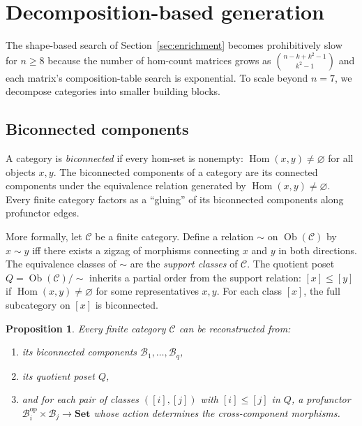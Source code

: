 \documentclass[12pt,a4paper]{amsart}
\newtheorem{proposition}[theorem]{Proposition}
\theoremstyle{definition}
\theoremstyle{remark}
\newcommand{\cat}{\mathcal}
\newcommand{\Set}{\mathbf{Set}}
\newcommand{\op}{\mathrm{op}}
\newcommand{\Ob}{\operatorname{Ob}}
\newcommand{\Hom}{\operatorname{Hom}}
\begin{document}
\section{Decomposition-based generation}
\label{sec:decomposition}

The shape-based search of Section~\ref{sec:enrichment} becomes
prohibitively slow for $n \geq 8$ because the number of hom-count
matrices grows as $\binom{n-k+k^2-1}{k^2-1}$ and each matrix's
composition-table search is exponential.  To scale beyond $n = 7$, we
decompose categories into smaller building blocks.

\subsection{Biconnected components}

A category is \emph{biconnected} if every hom-set is nonempty:
$\Hom(x,y) \neq \varnothing$ for all objects $x,y$.  The biconnected
components of a category are its connected components under the
equivalence relation generated by $\Hom(x,y) \neq \varnothing$.  Every
finite category factors as a ``gluing'' of its biconnected components
along profunctor edges.

More formally, let $\cat{C}$ be a finite category.  Define a relation
$\sim$ on $\Ob(\cat{C})$ by $x \sim y$ iff there exists a zigzag of
morphisms connecting $x$ and $y$ in both directions.  The equivalence
classes of $\sim$ are the \emph{support classes} of $\cat{C}$.  The
quotient poset $Q = \Ob(\cat{C}) / \sim$ inherits a partial order from
the support relation: $[x] \leq [y]$ if $\Hom(x,y) \neq \varnothing$ for
some representatives $x,y$.  For each class $[x]$, the full subcategory
on $[x]$ is biconnected.

\begin{proposition}
  \label{prop:decomposition}
  Every finite category $\cat{C}$ can be reconstructed from:
  \begin{enumerate}
  \item its biconnected components $\cat{B}_1, \dots, \cat{B}_q$,
  \item its quotient poset $Q$,
  \item and for each pair of classes $([i],[j])$ with $[i] \leq [j]$ in
    $Q$, a profunctor $\cat{B}_i^{\op} \times \cat{B}_j \to \Set$
    whose action determines the cross-component morphisms.
  \end{enumerate}
\end{proposition}
\end{document}
